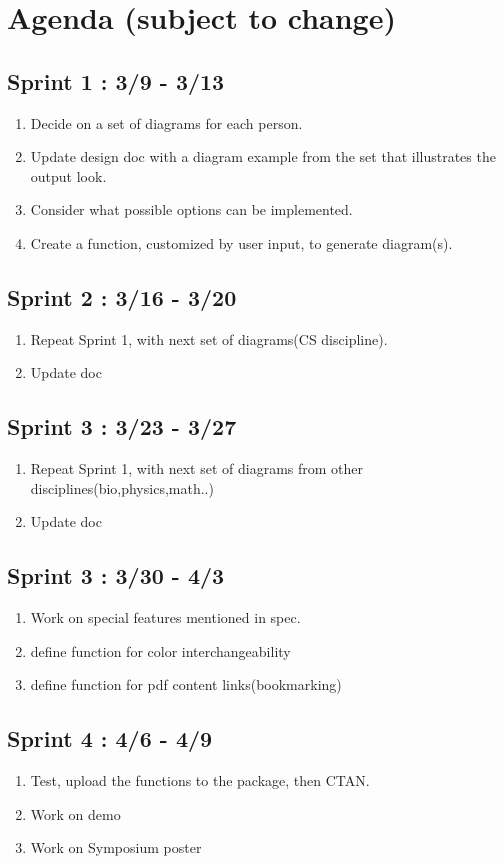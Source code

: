 \documentclass[10pt,a4paper,english]{article}
\begin{document}
\section*{Agenda \small{(subject to change)}}
\subsection{Sprint 1 : 3/9 - 3/13}
\begin{enumerate}
\item Decide on a set of diagrams for each person.
\item Update design doc with a diagram example from the set that illustrates the output look.
\item Consider what possible options can be implemented.
\item Create a function, customized by user input, to generate diagram(s).
\end{enumerate}
\subsection{Sprint 2 : 3/16 - 3/20}
\begin{enumerate}
\item Repeat Sprint 1, with next set of diagrams(CS discipline).
\item Update doc
\end{enumerate}
\subsection{Sprint 3 : 3/23 - 3/27}
\begin{enumerate} 
\item Repeat Sprint 1, with next set of diagrams from other disciplines(bio,physics,math..)
\item Update doc
\end{enumerate}
\subsection{Sprint 3 : 3/30 - 4/3}
\begin{enumerate}
\item Work on special features mentioned in spec.
\item define function for color interchangeability
\item define function for pdf content links(bookmarking)
\end{enumerate}
\subsection{Sprint 4 : 4/6 - 4/9}
\begin{enumerate}
\item Test, upload the functions to the package, then CTAN.
\item Work on demo
\item Work on Symposium poster
\end{enumerate}
\end{document}
